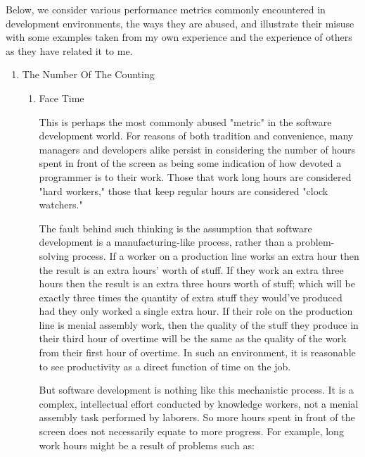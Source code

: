 \documentclass{article}
\begin{document}
Below, we consider various performance metrics commonly encountered in
development environments, the ways they are abused, and illustrate their
misuse with some examples taken from my own experience and the
experience of others as they have related it to me.

\begin{enumerate}
\item The Number Of The Counting
\label{sec:orgheadline176}

\begin{enumerate}
\item Face Time
\label{sec:orgheadline165}

This is perhaps the most commonly abused "metric" in the software
development world. For reasons of both tradition and convenience, many
managers and developers alike persist in considering the number of hours
spent in front of the screen as being some indication of how devoted a
programmer is to their work. Those that work long hours are considered
"hard workers," those that keep regular hours are considered "clock
watchers."

The fault behind such thinking is the assumption that software
development is a manufacturing-like process, rather than a
problem-solving process. If a worker on a production line works an extra
hour then the result is an extra hours' worth of stuff. If they work an
extra three hours then the result is an extra three hours worth of
stuff; which will be exactly three times the quantity of extra stuff
they would've produced had they only worked a single extra hour. If
their role on the production line is menial assembly work, then the
quality of the stuff they produce in their third hour of overtime will
be the same as the quality of the work from their first hour of
overtime. In such an environment, it is reasonable to see productivity
as a direct function of time on the job.

But software development is nothing like this mechanistic process. It is
a complex, intellectual effort conducted by knowledge workers, not a
menial assembly task performed by laborers. So more hours spent in front
of the screen does not necessarily equate to more progress. For example,
long work hours might be a result of problems such as:


\end{enumerate}
\end{enumerate}
\end{document}
